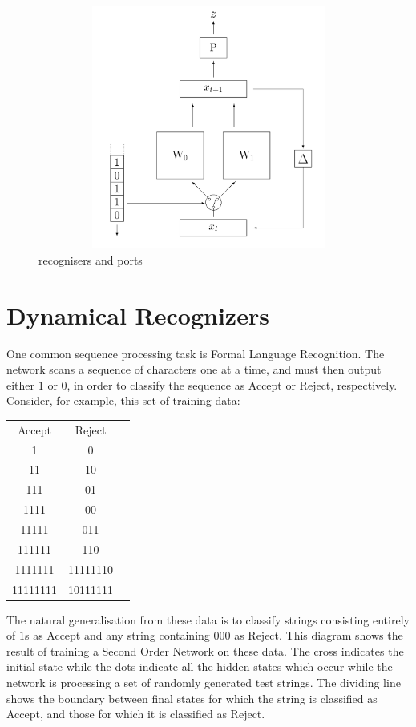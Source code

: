 \documentclass[11pt]{article}
\begin{document}
\begin{figure}[h]
    \centering
    \includegraphics[width=12cm, height=8cm]{../out/images/recognisers_and_ports}
    \caption{recognisers and ports}
    \label{fig: recognisers and ports}
\end{figure}

\section{Dynamical Recognizers}\label{sec:dynamical-recognizers}

    One common sequence processing task is Formal Language Recognition.
The network scans a sequence of characters one at a time, and must then output
either $1$ or $0$, in order to classify the sequence as Accept or Reject, respectively.
Consider, for example, this set of training data:

\begin{center}
\begin{tabular}{ |c|c|c| }
 \hline
 Accept & Reject \\
 1 & 0 \\
 11 & 10 \\
 111 & 01 \\
 1111 & 00 \\
 11111 & 011 \\
 111111 & 110 \\
 1111111 & 11111110\\
 11111111 & 10111111\\
 \hline
\end{tabular}
\end{center}

The natural generalisation from these data is to classify strings consisting
entirely of $1$s as Accept and any string containing 000 as Reject.
This diagram shows the result of training a Second Order Network on these data.
The cross indicates the initial state while the dots indicate all the hidden
states which occur while the network is processing a set of randomly generated
test strings.
The dividing line shows the boundary between final states for which the string
is classified as Accept, and those for which it is classified as Reject.
\end{document}
